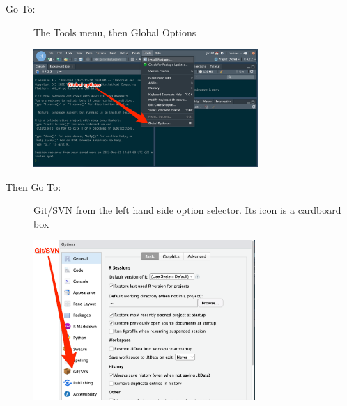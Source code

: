 \documentclass[
  letterpaper,
  DIV=11,
  numbers=noendperiod]{scrartcl}
\begin{document}
\begin{tcolorbox}[enhanced jigsaw, leftrule=.75mm, colback=white, left=2mm, bottomrule=.15mm, rightrule=.15mm, breakable, arc=.35mm, opacityback=0, colframe=quarto-callout-tip-color-frame, toprule=.15mm]

\textbf{}\vspace{2mm}

\begin{description}
\item[Go To:]
The Tools menu, then Global Options
\end{description}

\begin{figure}[H]

{\centering \includegraphics[width=0.76\textwidth,height=\textheight]{github_onboarding_assets/global_options.png}

}

\end{figure}

\begin{description}
\item[Then Go To:]
Git/SVN from the left hand side option selector. Its icon is a cardboard
box
\end{description}

\begin{figure}[H]

{\centering \includegraphics[width=0.75\textwidth,height=\textheight]{github_onboarding_assets/git_svn.png}

}
\end{figure}
\end{tcolorbox}
\end{document}
